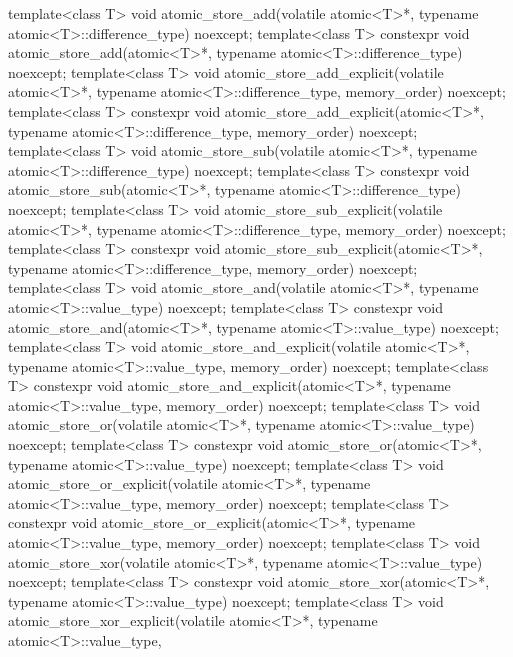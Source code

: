 \begin{codeblock}
{  template<class T>
    void atomic_store_add(volatile atomic<T>*, typename atomic<T>::difference_type) noexcept;
  template<class T>
    constexpr void atomic_store_add(atomic<T>*, typename atomic<T>::difference_type) noexcept;
  template<class T>
    void atomic_store_add_explicit(volatile atomic<T>*, typename atomic<T>::difference_type,
                                   memory_order) noexcept;
  template<class T>
    constexpr void atomic_store_add_explicit(atomic<T>*, typename atomic<T>::difference_type,
                                             memory_order) noexcept;
  template<class T>
    void atomic_store_sub(volatile atomic<T>*, typename atomic<T>::difference_type) noexcept;
  template<class T>
    constexpr void atomic_store_sub(atomic<T>*, typename atomic<T>::difference_type) noexcept;
  template<class T>
    void atomic_store_sub_explicit(volatile atomic<T>*, typename atomic<T>::difference_type,
                                   memory_order) noexcept;
  template<class T>
    constexpr void atomic_store_sub_explicit(atomic<T>*, typename atomic<T>::difference_type,
                                             memory_order) noexcept;
  template<class T>
    void atomic_store_and(volatile atomic<T>*, typename atomic<T>::value_type) noexcept;
  template<class T>
    constexpr void atomic_store_and(atomic<T>*, typename atomic<T>::value_type) noexcept;
  template<class T>
    void atomic_store_and_explicit(volatile atomic<T>*, typename atomic<T>::value_type,
                                   memory_order) noexcept;
  template<class T>
    constexpr void atomic_store_and_explicit(atomic<T>*, typename atomic<T>::value_type,
                                             memory_order) noexcept;
  template<class T>
    void atomic_store_or(volatile atomic<T>*, typename atomic<T>::value_type) noexcept;
  template<class T>
    constexpr void atomic_store_or(atomic<T>*, typename atomic<T>::value_type) noexcept;
  template<class T>
    void atomic_store_or_explicit(volatile atomic<T>*, typename atomic<T>::value_type,
                                  memory_order) noexcept;
  template<class T>
    constexpr void atomic_store_or_explicit(atomic<T>*, typename atomic<T>::value_type,
                                            memory_order) noexcept;
  template<class T>
    void atomic_store_xor(volatile atomic<T>*, typename atomic<T>::value_type) noexcept;
  template<class T>
    constexpr void atomic_store_xor(atomic<T>*, typename atomic<T>::value_type) noexcept;
  template<class T>
    void atomic_store_xor_explicit(volatile atomic<T>*, typename atomic<T>::value_type,
}
\end{codeblock}
